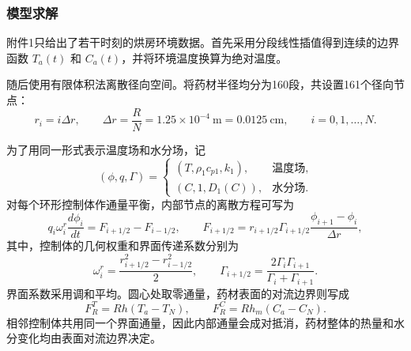 \documentclass[12pt,a4paper,fontset=none]{ctexart}
\begin{document}
\subsubsection{模型求解}
附件1只给出了若干时刻的烘房环境数据。首先采用分段线性插值得到连续的边界函数 $T_a(t)$ 和 $C_a(t)$，并将环境温度换算为绝对温度。

随后使用有限体积法离散径向空间。将药材半径均分为160段，共设置161个径向节点：
\begin{equation}
r_i=i\Delta r,\qquad \Delta r=\frac{R}{N}=1.25\times10^{-4}\ \mathrm m
=0.0125\ \mathrm{cm},\qquad i=0,1,\ldots,N.
\end{equation}

为了用同一形式表示温度场和水分场，记
\begin{equation}
(\phi,q,\Gamma)=
\begin{cases}
(T,\rho_1c_{p1},k_1), & \text{温度场},\\
(C,1,D_1(C)), & \text{水分场}.
\end{cases}
\end{equation}
对每个环形控制体作通量平衡，内部节点的离散方程可写为
\begin{equation}
q_i\omega_i^r\frac{d\phi_i}{dt}=F_{i+1/2}-F_{i-1/2},\qquad
F_{i+1/2}=r_{i+1/2}\Gamma_{i+1/2}
\frac{\phi_{i+1}-\phi_i}{\Delta r},\label{eq:fvm-r}
\end{equation}
其中，控制体的几何权重和界面传递系数分别为
\begin{equation}
\omega_i^r=\frac{r_{i+1/2}^2-r_{i-1/2}^2}{2},\qquad
\Gamma_{i+1/2}=\frac{2\Gamma_i\Gamma_{i+1}}{\Gamma_i+\Gamma_{i+1}}.
\end{equation}
界面系数采用调和平均\cite{patankar}。圆心处取零通量，药材表面的对流边界则写成
\begin{equation}
F_R^T=Rh(T_a-T_N),\qquad F_R^C=Rh_m(C_a-C_N).
\end{equation}
相邻控制体共用同一个界面通量，因此内部通量会成对抵消，药材整体的热量和水分变化均由表面对流边界决定。
\end{document}
